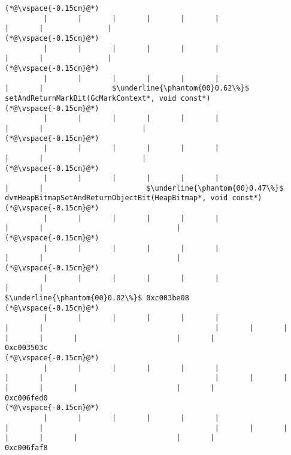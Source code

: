 \begin{lstlisting}[caption=NewDirectByteBuffer, label=profile:C2JNewDirectBuffer-512, numberbychapter=true, frame=lines, float, floatplacement=t]
(*@\vspace{-0.15cm}@*)
         |       |       |       |       |       |                       |       |               |
(*@\vspace{-0.15cm}@*)
         |       |       |       |       |       |                       |       |               |
(*@\vspace{-0.15cm}@*)
         |       |       |       |       |       |                       |       |                $\underline{\phantom{00}0.62\%}$ setAndReturnMarkBit(GcMarkContext*, void const*)
(*@\vspace{-0.15cm}@*)
         |       |       |       |       |       |                       |       |                       |
(*@\vspace{-0.15cm}@*)
         |       |       |       |       |       |                       |       |                       |
(*@\vspace{-0.15cm}@*)
         |       |       |       |       |       |                       |       |                        $\underline{\phantom{00}0.47\%}$ dvmHeapBitmapSetAndReturnObjectBit(HeapBitmap*, void const*)
(*@\vspace{-0.15cm}@*)
         |       |       |       |       |       |                       |       |                               |
(*@\vspace{-0.15cm}@*)
         |       |       |       |       |       |                       |       |                               |
(*@\vspace{-0.15cm}@*)
         |       |       |       |       |       |                       |       |                                $\underline{\phantom{00}0.02\%}$ 0xc003be08
(*@\vspace{-0.15cm}@*)
         |       |       |       |       |       |                       |       |                                        |       |       |       |       |       |                       |       |                                       0xc003503c
(*@\vspace{-0.15cm}@*)
         |       |       |       |       |       |                       |       |                                        |       |       |       |       |       |                       |       |                                       0xc006fed0
(*@\vspace{-0.15cm}@*)
         |       |       |       |       |       |                       |       |                                        |       |       |       |       |       |                       |       |                                       0xc006faf8

\end{lstlisting}
